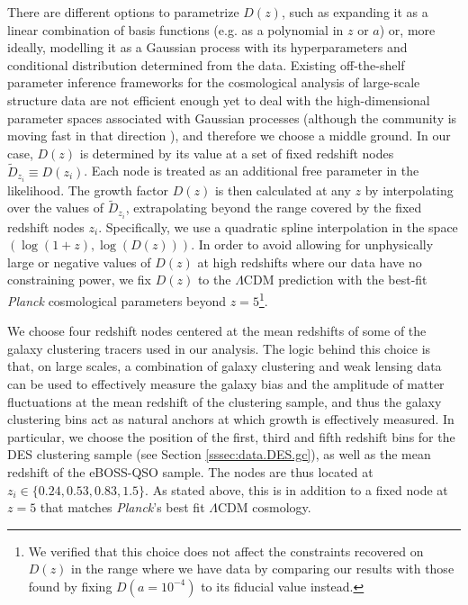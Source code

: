 \documentclass[a4paper,11pt]{article}
\newcommand{\lcdm}{$\Lambda$CDM\xspace}
\newcommand{\des}{DES\xspace}
\newcommand{\planck}{{\sl Planck}\xspace}
\newcommand{\eboss}{eBOSS-QSO\xspace}
\begin{document}
      There are different options to parametrize $D(z)$, such as expanding it as a linear combination of basis functions (e.g. as a polynomial in $z$ or $a$) or, more ideally, modelling it as a Gaussian process with its hyperparameters and conditional distribution determined from the data. Existing off-the-shelf parameter inference frameworks for the cosmological analysis of large-scale structure data are not efficient enough yet to deal with the high-dimensional parameter spaces associated with Gaussian processes (although the community is moving fast in that direction \cite{2104.14568,2105.02256}), and therefore we choose a middle ground. In our case, $D(z)$ is determined by its value at a set of fixed redshift nodes $\tilde{D}_{z_i}\equiv D(z_i)$. Each node is treated as an additional free parameter in the likelihood. The growth factor $D(z)$ is then calculated at any $z$ by interpolating over the values of $\tilde{D}_{z_i}$, extrapolating beyond the range covered by the fixed redshift nodes $z_i$. Specifically, we use a quadratic spline interpolation in the space $(\log(1+z),\log(D(z)))$. In order to avoid allowing for unphysically large or negative values of $D(z)$ at high redshifts where our data have no constraining power, we fix $D(z)$ to the $\Lambda$CDM prediction with the best-fit \planck cosmological parameters beyond $z=5$\footnote{We verified that this choice does not affect the constraints recovered on $D(z)$ in the range where we have data by comparing our results with those found by fixing $D(a = 10^{-4})$ to its fiducial value instead.}.

      We choose four redshift nodes centered at the mean redshifts of some of the galaxy clustering tracers used in our analysis. The logic behind this choice is that, on large scales, a combination of galaxy clustering and weak lensing data can be used to effectively measure the galaxy bias and the amplitude of matter fluctuations at the mean redshift of the clustering sample, and thus the galaxy clustering bins act as natural anchors at which growth is effectively measured. In particular, we choose the position of the first, third and fifth redshift bins for the \des clustering sample (see Section \ref{sssec:data.DES.gc}), as well as the mean redshift of the \eboss sample. The nodes are thus located at $z_i\in\{0.24, 0.53, 0.83, 1.5\}$. As stated above, this is in addition to a fixed node at $z=5$ that matches \planck's best fit \lcdm cosmology.
\end{document}
